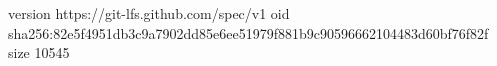 version https://git-lfs.github.com/spec/v1
oid sha256:82e5f4951db3c9a7902dd85e6ee51979f881b9c90596662104483d60bf76f82f
size 10545
